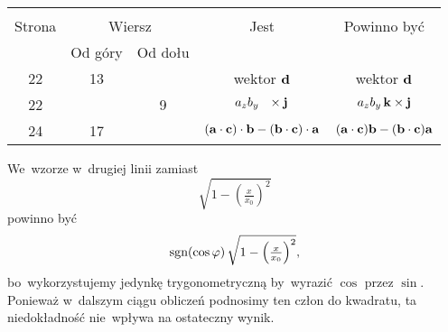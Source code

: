 \documentclass[a4paper,11pt]{article}
\begin{document}


\begin{center}

  \begin{tabular}{|c|c|c|c|c|}
    \hline
    & \multicolumn{2}{c|}{} & & \\
    Strona & \multicolumn{2}{c|}{Wiersz} & Jest
                              & Powinno być \\ \cline{2-3}
    & Od góry & Od dołu & & \\
    \hline
    22 & 13 & & wektor{ }{ }{ }$\mathbf{d}$ & wektor $\mathbf{d}$ \\
    22 & &  9 & $a_{ z } b_{ y } \, \hphantom{k} \times \mathbf{j}$
           & $a_{ z } b_{ y } \, \mathbf{k} \times \mathbf{j}$ \\
    24 & 17 & &  $( \mathbf{a} \cdot \mathbf{c} ) \cdot \mathbf{b}
                - ( \mathbf{b} \cdot \mathbf{c} ) \cdot \mathbf{a}$
           & $( \mathbf{a} \cdot \mathbf{c} ) \mathbf{b}
             - ( \mathbf{b} \cdot \mathbf{c} ) \mathbf{a}$ \\
    \hline
  \end{tabular}

\end{center}


\noindent



\vspace{\spaceTwo}














\start {} We~wzorze w~drugiej linii zamiast
\begin{equation}
  \label{eq:SkalmierskiMechanikaZWytrzymaloscia-01}
  \sqrt{ 1 - \left( \tfrac{ x }{ x_{ 0 } } \right)^{ 2 } }
\end{equation}
powinno być
\begin{equation}
  \label{eq:SkalmierskiMechanikaZWytrzymaloscia-02}
  \textrm{sgn}( \cos \varphi ) \,
  \sqrt{ 1 - \left( \tfrac{ x }{ x_{ 0 } } \right)^{ 2 } },
\end{equation}
bo~wykorzystujemy jedynkę trygonometryczną by~wyrazić $\cos$ przez
$\sin$. Ponieważ w~dalszym ciągu obliczeń podnosimy ten człon do
kwadratu, ta niedokładność nie~wpływa na ostateczny wynik.
\end{document}
